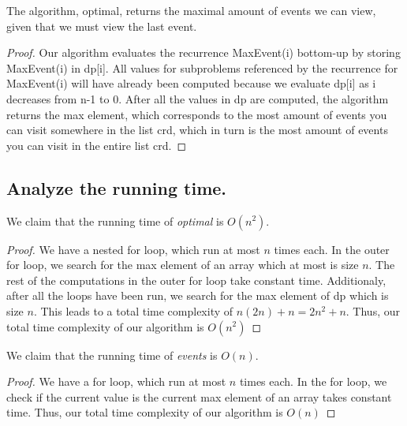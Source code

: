 \documentclass[11pt]{scrartcl}
\begin{document}
\begin{corollary*}
	The algorithm, optimal, returns the maximal amount of events we can view, given that we must view the last event.

	\begin{proof}
		Our algorithm evaluates the recurrence MaxEvent(i) bottom-up by storing MaxEvent(i) in dp[i].
		All values for subproblems referenced by the recurrence for MaxEvent(i) will have already been computed
		because we evaluate dp[i] as i decreases from n-1 to 0.
		After all the values in dp are computed, the algorithm returns the max element,
		which corresponds to the most amount of events you can visit somewhere in the list crd,
		which in turn is the most amount of events you can visit in the entire list crd.
	\end{proof}

\end{corollary*}

\iffalse
\begin{corollary*}
	The algorithm, events, correctly traces the events selected.
	\begin{proof}
		$$\textbf{DO THIS PART }$$
	\end{proof}
\end{corollary*}

\fi


\subsection{
	Analyze the running time.
}
We claim that the running time of \textit{optimal} is $O(n^2)$.
\begin{proof}
	We have a nested for loop, which run at most $n$ times each.
	In the outer for loop, we search for the max element of an array
	which at most is size $n$. The rest of the computations in the outer for loop take constant time.
	Additionaly, after all the loops have been run, we search for the max element of dp which is
	size $n$. This leads to a total time complexity of $n(2n) + n = 2n^2 + n$.
	Thus, our total time complexity of our algorithm is $O(n^2)$
\end{proof}
We claim that the running time of \textit{events} is $O(n)$.
\begin{proof}
	We have a for loop, which run at most $n$ times each.
	In the for loop, we check if the current value is the current max element of an array takes constant time.
	Thus, our total time complexity of our algorithm is $O(n)$
\end{proof}
\end{document}
